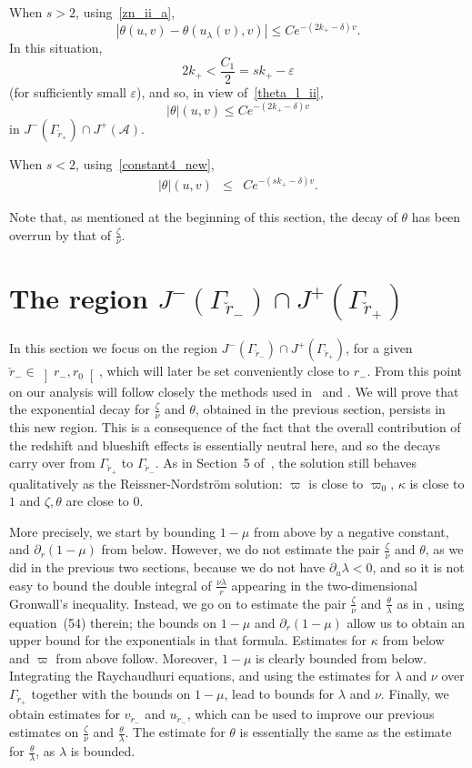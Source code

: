 \documentclass[a4paper,11pt,oneside,reqno]{amsart}
\newcommand{\s}{s}
\newcommand{\kk}{k_+}
\newcommand{\cal}{\mathcal}
\newcommand{\eps}{\varepsilon}
\newcommand{\ckrm}{\check r_-}
\newcommand{\ckrp}{\check r_+}
\begin{document}
When $\s>2$, using~\eqref{zn_ii_a},
$$
|\theta(u,v)-\theta(u_\lambda(v),v)|\leq C
e^{-(2\kk-\delta)v}.
$$
In this situation,
$$
2\kk<\frac{C_1}{2}=\s\kk-\eps
$$
(for sufficiently small $\eps$),
and so, in view of~\eqref{theta_l_ii},
\begin{equation}\label{theta_rp_ii_a}
|\theta|(u,v)\leq C
e^{-(2\kk-\delta)v}
\end{equation}
in $J^-(\Gamma_{\ckrp})\cap J^+({\cal A})$.


When  $\s<2$, using~\eqref{constant4_new},
\begin{eqnarray}
|\theta|(u,v)&\leq&
\label{theta_rp_ii_c} C
e^{-(\s\kk-\delta)v}.
\end{eqnarray}

Note that, as mentioned at the beginning of this section, the decay of $\theta$ has been overrun by that of $\frac{\zeta}{\nu}$.


\section{The region $J^-(\Gamma_{\ckrm})\cap J^+(\Gamma_{\ckrp})$}\label{section6}

In this section we focus on the region $J^-(\Gamma_{\ckrm})\cap J^+(\Gamma_{\ckrp})$, for a given ${\ckrm} \in \left]r_-,r_0\right[$, which will later be set conveniently close to $r_-$. From this point on our analysis will follow closely the methods used in~\cite{relIst2} and \cite{relIst3}. We will prove that the exponential decay for $\frac{\zeta}{\nu}$ and $\theta$, obtained in the previous section, persists in this new region. This is a consequence of the fact that the overall contribution of the redshift and blueshift effects is essentially neutral here, and so the decays carry over from $\Gamma_{\ckrp}$ to $\Gamma_{\ckrm}$. As in Section~5 of~\cite{relIst2}, the solution still behaves qualitatively as the Reissner-Nordstr\"om solution: $\varpi$ is close to $\varpi_0$, $\kappa$ is close to $1$ and $\zeta, \theta$ are close to $0$.

More precisely, we start by bounding $1-\mu$ from above by a negative constant,
and $\partial_r(1-\mu)$ from below. However,
we do not estimate the pair $\frac{\zeta}{\nu}$ and $\theta$,
as we did in the previous two sections, because we do not have $\partial_u\lambda<0$,
and so it is not easy to bound the double integral of $\frac{\nu\lambda}{r}$ appearing in the two-dimensional Gronwall's inequality.
Instead, we go on to
estimate the pair $\frac{\zeta}{\nu}$ and $\frac{\theta}{\lambda}$
as in \cite{relIst2}, using equation~(54) therein;
the bounds on $1-\mu$ and $\partial_r(1-\mu)$
allow us to obtain an upper bound for the exponentials in that formula.
Estimates for $\kappa$ from below and
$\varpi$ from above follow. Moreover, $1-\mu$ is clearly bounded from below.
Integrating the Raychaudhuri equations, and using the estimates for $\lambda$ and $\nu$
over $\Gamma_{\ckrp}$ together with the bounds on $1-\mu$, lead to
bounds for $\lambda$ and $\nu$. Finally, we obtain estimates for 
$v_{\ckrm}$ and $u_{\ckrm}$, which can be used to improve our previous estimates on
$\frac{\zeta}{\nu}$ and $\frac{\theta}{\lambda}$. The estimate for $\theta$ is essentially the same as the estimate for $\frac{\theta}{\lambda}$, as $\lambda$ is bounded.
\end{document}
